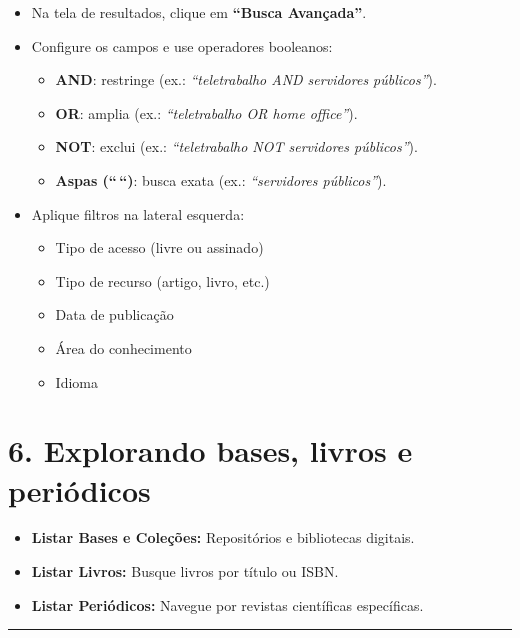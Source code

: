 \documentclass[
  letterpaper,
  DIV=11,
  numbers=noendperiod]{scrreprt}
\providecommand{\tightlist}{%
  \setlength{\itemsep}{0pt}\setlength{\parskip}{0pt}}
\begin{document}
\begin{itemize}
\tightlist
\item
  Na tela de resultados, clique em \textbf{``Busca Avançada''}.
\item
  Configure os campos e use operadores booleanos:

  \begin{itemize}
  \tightlist
  \item
    \textbf{AND}: restringe (ex.: \emph{``teletrabalho AND servidores
    públicos''}).
  \item
    \textbf{OR}: amplia (ex.: \emph{``teletrabalho OR home office''}).
  \item
    \textbf{NOT}: exclui (ex.: \emph{``teletrabalho NOT servidores
    públicos''}).
  \item
    \textbf{Aspas (``\,``)}: busca exata (ex.: \emph{``servidores
    públicos''}).
  \end{itemize}
\item
  Aplique filtros na lateral esquerda:

  \begin{itemize}
  \tightlist
  \item
    Tipo de acesso (livre ou assinado)
  \item
    Tipo de recurso (artigo, livro, etc.)
  \item
    Data de publicação
  \item
    Área do conhecimento
  \item
    Idioma
  \end{itemize}
\end{itemize}

\section{6. Explorando bases, livros e
periódicos}\label{explorando-bases-livros-e-periuxf3dicos}

\begin{itemize}
\tightlist
\item
  \textbf{Listar Bases e Coleções:} Repositórios e bibliotecas digitais.
\item
  \textbf{Listar Livros:} Busque livros por título ou ISBN.
\item
  \textbf{Listar Periódicos:} Navegue por revistas científicas
  específicas.
\end{itemize}

\begin{center}\rule{0.5\linewidth}{0.5pt}\end{center}
\end{document}
